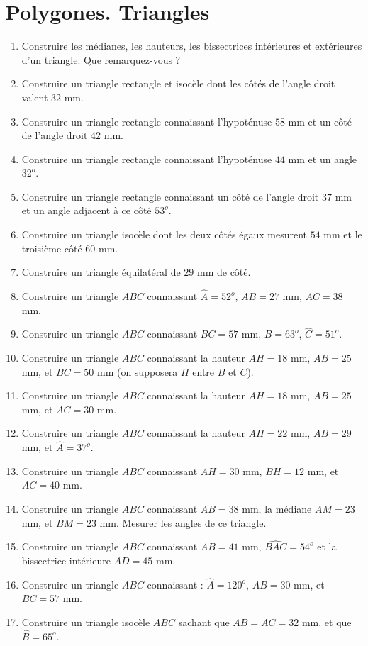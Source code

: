 
\chapter{Polygones. Triangles} 
\begin{enumerate}
\item Construire les médianes, les hauteurs, les bissectrices intérieures et extérieures d'un triangle. Que remarquez-vous ? 
\item Construire un triangle rectangle et isocèle dont les côtés de l'angle droit valent $32$ mm. 
\item Construire un triangle rectangle connaissant l'hypoténuse $58$ mm et un côté de 
l'angle droit $42$ mm. 
\item Construire un triangle rectangle connaissant l'hypoténuse $44$ mm et un angle
$32^o$. 
\item Construire un triangle rectangle connaissant un côté de l'angle droit $37$ mm et un angle adjacent à ce côté $53^o$. 
\item Construire un triangle isocèle dont les deux côtés égaux mesurent $54$ mm et le troisième côté $60$ mm. 
\item Construire un triangle équilatéral de $29$ mm de côté. 
\item Construire un triangle $ABC$ connaissant $\widehat{A}=52^o$, $AB=27$ mm, $AC=38$ mm. 
\item Construire un triangle $ABC$ connaissant $BC = 57$ mm, $\widehat{B}= 63^o$, $\widehat{C}= 51^o$. 
\item Construire un triangle $ABC$ connaissant la hauteur $AH=18$ mm, $AB=25$ mm, et $BC=50$ mm (on supposera $H$ entre $B$ et $C$). 
\item Construire un triangle $ABC$ connaissant la hauteur $AH= 18$ mm, $AB=25$ mm, et $AC=30$ mm.
\item Construire un triangle $ABC$ connaissant la hauteur $AH=22$ mm, $AB=29$ mm, et $\widehat{A}=37^o$. 
\item Construire un triangle $ABC$ connaissant $AH=30$ mm, $BH= 12$ mm, et $AC=40$ mm. 
\item Construire un triangle $ABC$ connaissant $AB=38$ mm, la médiane $AM=23$ mm, et $BM=23$ mm. Mesurer les angles de ce triangle. 
\item Construire un triangle $ABC$ connaissant $AB=41$ mm, $\widehat{BAC}= 54^o$
et la bissectrice intérieure $AD=45$ mm. 
\item Construire un triangle $ABC$ connaissant : $\widehat{A}= 120^o$, $AB= 30$ mm, et $BC = 57$ mm. 
\item Construire un triangle isocèle $ABC$ sachant que $AB=AC=32$ mm, et que $\widehat{B}= 65^o$. 

\end{enumerate}
